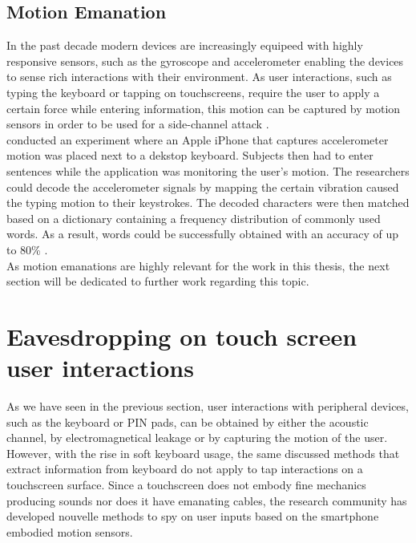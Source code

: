 \subsection{Motion Emanation}
In the past decade modern devices are increasingly equipeed with highly responsive sensors, such as the gyroscope and accelerometer enabling the devices to sense rich interactions with their environment. As user interactions, such as typing the keyboard or tapping on touchscreens, require the user to apply a certain force while entering information, this motion can be captured by motion sensors in order to be used for a side-channel attack \cite{Tapprints,Accessory,Touchlogger}. \\

\citeauthor{Marquardt:2011:IDV:2046707.2046771} conducted an experiment where an Apple iPhone that captures accelerometer motion was placed next to a dekstop keyboard. Subjects then had to enter sentences while the application was monitoring the user's motion. The researchers could decode the accelerometer signals by mapping the certain vibration caused the typing motion to their keystrokes. The decoded characters were then matched based on a dictionary containing a frequency distribution of commonly used words. As a result, words could be successfully obtained with an accuracy of up to 80\% \cite{Marquardt:2011:IDV:2046707.2046771}.\\

As motion emanations are highly relevant for the work in this thesis, the next section will be dedicated to further work regarding this topic.

\section{Eavesdropping on touch screen user interactions}
As we have seen in the previous section, user interactions with peripheral devices, such as the keyboard or PIN pads, can be obtained by either the acoustic channel, by electromagnetical leakage or by capturing the motion of the user. However, with the rise in soft keyboard usage, the same discussed methods that extract information from keyboard do not apply to tap interactions on a touchscreen surface. Since a touchscreen does not embody fine mechanics producing sounds nor does it have emanating cables, the research community has developed nouvelle methods to spy on user inputs based on the smartphone embodied motion sensors.\\


